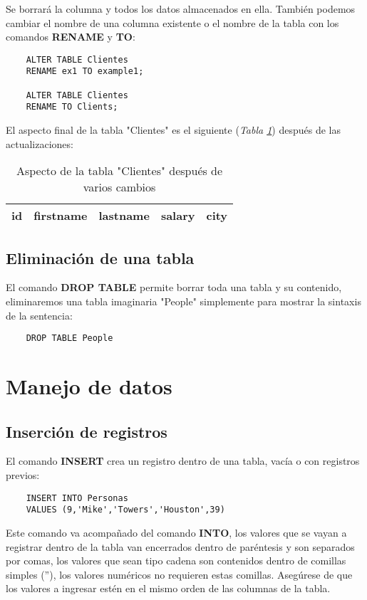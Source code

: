 Se borrará la columna y todos los datos almacenados en ella. También podemos cambiar el nombre de una columna existente o el nombre de la tabla con los comandos \textbf{RENAME} y \textbf{TO}:
\begin{lstlisting}
    ALTER TABLE Clientes
    RENAME ex1 TO example1;

    ALTER TABLE Clientes
    RENAME TO Clients;
\end{lstlisting}

El aspecto final de la tabla "Clientes" es el siguiente (\textit{Tabla \ref{tab: 21}}) después de las actualizaciones:
\begin{table}[H]
    \centering
    \caption{Aspecto de la tabla "Clientes" después de varios cambios}
    \label{tab: 21}
    \begin{tabular}{|l|l|l|l|l|}
        \hline
        \textbf{id} & \textbf{firstname} & \textbf{lastname} & \textbf{salary} & \textbf{city} \\
        \hline
    \end{tabular}
\end{table}


\subsection{Eliminación de una tabla}

El comando \textbf{DROP TABLE} permite borrar toda una tabla y su contenido, eliminaremos una tabla imaginaria "People" simplemente para mostrar la sintaxis de la sentencia:
\begin{lstlisting}
    DROP TABLE People
\end{lstlisting}



\section{Manejo de datos}


\subsection{Inserción de registros}

El comando \textbf{INSERT} crea un registro dentro de una tabla, vacía o con registros previos:
\begin{lstlisting}
    INSERT INTO Personas
    VALUES (9,'Mike','Towers','Houston',39)
\end{lstlisting}

Este comando va acompañado del comando \textbf{INTO}, los valores que se vayan a registrar dentro de la tabla van encerrados dentro de paréntesis y son separados por comas, los valores que sean tipo cadena son contenidos dentro de comillas simples (''), los valores numéricos no requieren estas comillas. Asegúrese de que los valores a ingresar estén en el mismo orden de las columnas de la tabla.

